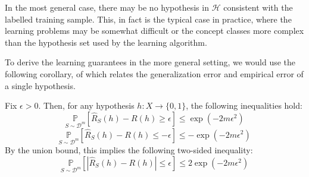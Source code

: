In the most general case, there may be no hypothesis in $\mathcal{H}$ consistent with the labelled training sample. This, in fact is the typical case in practice, where the learning problems may be somewhat difficult or the concept classes more complex than the hypothesis set used by the learning algorithm. 

To derive the learning guarantees in the more general setting, we would use the following corollary, of which relates the generalization error and empirical error of a single hypothesis. 
\begin{col}
    Fix $\epsilon > 0$. Then, for any hypothesis $h: X \to \{0,1\}$, the following inequalities hold: 
    \begin{equation}
        \underset{S\sim \mathcal{D}^m}{\mathbb{P}} \left[\hat{R}_S (h) - R(h) \geq \epsilon\right] \leq \exp{(-2m\epsilon^2)}
    \end{equation}
    \begin{equation}
        \underset{S\sim \mathcal{D}^m}{\mathbb{P}} \left[\hat{R}_S (h) - R(h) \leq -\epsilon\right] \leq -\exp{(-2m\epsilon^2)}
    \end{equation}
    By the union bound, this implies the following two-sided inequality: 
    \begin{equation}
        \underset{S\sim \mathcal{D}^m}{\mathbb{P}} \left[|\hat{R}_S (h) - R(h)| \leq \epsilon\right] \leq 2\exp{(-2m\epsilon^2)}
    \end{equation}
\end{col}

